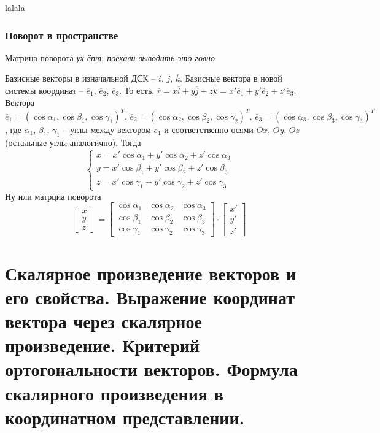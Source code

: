 \documentclass{article}
\begin{document}
    lalala

\subsubsection{Поворот в пространстве}

    Матрица поворота
    \textit{ух ёпт, поехали выводить это говно}

    Базисные векторы в изначальной ДСК -- $\overline{i},\,\overline{
    j},\,\overline{k}$. Базисные вектора в новой системы координат -- $\overline{e}_1,\,\overline{e}_2,\,\overline{e}_3$. То есть, $\overline{r}=x\overline{i}+y\overline{j}+z\overline{k}=x'\overline{e}_1+y'\overline{e}_2+z'\overline{e}_3 $. Вектора $\overline{e}_1=(\cos\alpha_1,\cos\beta_1,\cos\gamma_1)^T,\,\overline{e}_2=(\cos\alpha_2,\cos\beta_2,\cos\gamma_2)^T,\,\overline{e}_3=(\cos\alpha_3,\cos\beta_3,\cos\gamma_3)^T$, где $\alpha_1,\,\beta_1,\,\gamma_1$ -- углы между вектором $\overline{e}_1$ и соответственно осями $Ox,\,Oy,\,Oz$ (остальные углы аналогично). Тогда
    $$ \begin{cases} x=x'\cos\alpha_1+y'\cos\alpha_2+z'\cos\alpha_3 \\ y=x'\cos\beta_1+y'\cos\beta_2+z'\cos\beta_3 \\ z=x'\cos\gamma_1+y'\cos\gamma_2+z'\cos\gamma_3 \end{cases} $$
    Ну или матрциа поворота
    \[
    \begin{bmatrix}
    x \\
    y \\
    z
    \end{bmatrix}
    =
    \begin{bmatrix}
    \cos\alpha_1 & \cos\alpha_2 & \cos\alpha_3 \\
    \cos\beta_1 & \cos\beta_2 & \cos\beta_3 \\
    \cos\gamma_1 & \cos\gamma_2 & \cos\gamma_3
    \end{bmatrix} \cdot
    \begin{bmatrix}
    x' \\
    y' \\
    z'
    \end{bmatrix}
    \]

\newpage
\section{Скалярное произведение векторов и его свойства. Выражение координат вектора через скалярное произведение. Критерий ортогональности векторов. Формула скалярного произведения в координатном представлении.}
\end{document}
